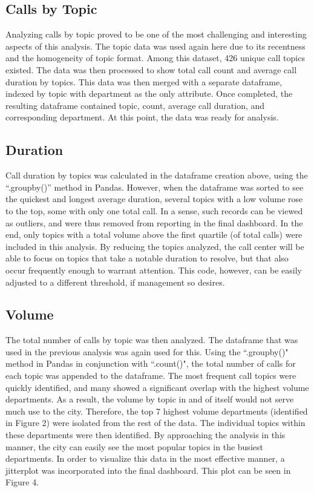 \documentclass[11pt,twocolumn]{article}
\begin{document}
	\subsection{Calls by Topic}

Analyzing calls by topic proved to be one of the most challenging and interesting aspects of this analysis.  The topic data was used again here due to its recentness and the homogeneity of topic format.  Among this dataset, 426 unique call topics existed.  The data was then processed to show total call count and average call duration by topics.  This data was then merged with a separate dataframe, indexed by topic with department as the only attribute.  Once completed, the resulting dataframe contained topic, count, average call duration, and corresponding department.  At this point, the data was ready for analysis.

\subsection{Duration}
Call duration by topics was calculated in the dataframe creation above, using the ``.groupby()'' method in Pandas.  However, when the dataframe was sorted to see the quickest and longest average duration, several topics with a low volume rose to the top, some with only one total call.  In a sense, such records can be viewed as outliers, and were thus removed from reporting in the final dashboard.  In the end, only topics with a total volume above the first quartile (of total calls) were included in this analysis.  By reducing the topics analyzed, the call center will be able to focus on topics that take a notable duration to resolve, but that also occur frequently enough to warrant attention.  This code, however, can be easily adjusted to a different threshold, if management so desires.

\subsection{Volume}
The total number of calls by topic was then analyzed.  The dataframe that was used in the previous analysis was again used for this.  Using the ``.groupby()" method in Pandas in conjunction with ``.count()", the total number of calls for each topic was appended to the dataframe.  The most frequent call topics were quickly identified, and many showed a significant overlap with the highest volume departments.  As a result, the volume by topic in and of itself would not serve much use to the city.  Therefore, the top 7 highest volume departments (identified in Figure 2) were isolated from the rest of the data.  The individual topics within these departments were then identified.  By approaching the analysis in this manner, the city can easily see the most popular topics in the busiest departments.  In order to visualize this data in the most effective manner, a jitterplot was incorporated into the final dashboard.  This plot can be seen in Figure 4.
\end{document}
